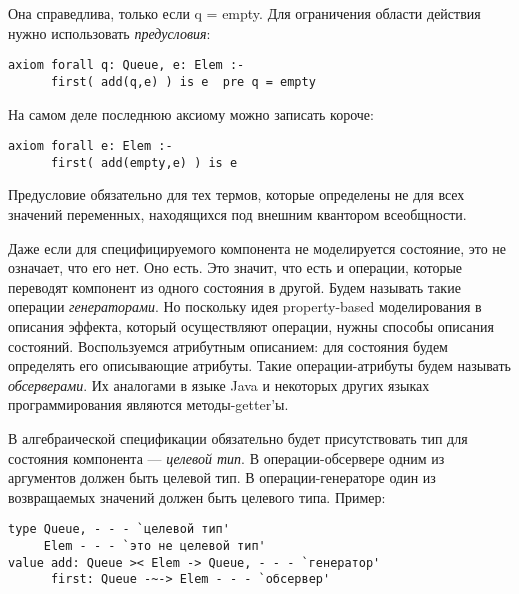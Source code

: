 Она справедлива, только если q = empty. Для ограничения области действия нужно использовать \emph{предусловия}:
\begin{lstlisting}
axiom forall q: Queue, e: Elem :-
      first( add(q,e) ) is e  pre q = empty
\end{lstlisting}

На самом деле последнюю аксиому можно записать короче:
\begin{lstlisting}
axiom forall e: Elem :-
      first( add(empty,e) ) is e
\end{lstlisting}

Предусловие обязательно для тех термов, которые определены не для всех значений переменных, находящихся под внешним квантором всеобщности.


Даже если для специфицируемого компонента не моделируется состояние, это не означает, что его нет. Оно есть. Это значит, что есть и операции, которые переводят компонент из одного состояния в другой. Будем называть такие операции \emph{генераторами}. Но поскольку идея property-based моделирования в описания эффекта, который осуществляют операции, нужны способы описания состояний. Воспользуемся атрибутным описанием: для состояния будем определять его описывающие атрибуты. Такие операции-атрибуты будем называть \emph{обсерверами}. Их аналогами в языке Java и некоторых других языках программирования являются методы-getter'ы.

В алгебраической спецификации обязательно будет присутствовать тип для состояния компонента --- \emph{целевой тип}. В операции-обсервере одним из аргументов должен быть целевой тип. В операции-генераторе один из возвращаемых значений должен быть целевого типа. Пример:
\begin{lstlisting}[escapeinside=`']
type Queue, - - - `целевой тип'
     Elem - - - `это не целевой тип'
value add: Queue >< Elem -> Queue, - - - `генератор'
      first: Queue -~-> Elem - - - `обсервер'
\end{lstlisting}




